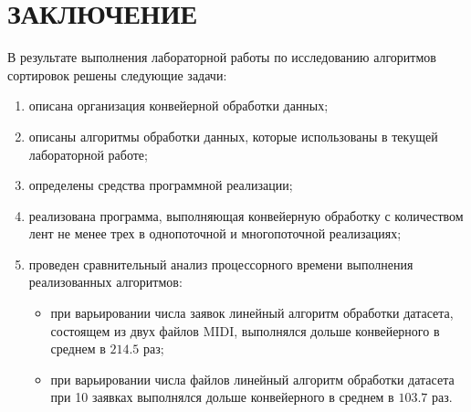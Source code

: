 \chapter*{ЗАКЛЮЧЕНИЕ}

В результате выполнения лабораторной работы по исследованию алгоритмов сортировок решены следующие задачи:
\begin{enumerate}
    \item описана организация конвейерной обработки данных;
	\item описаны алгоритмы обработки данных, которые использованы в текущей лабораторной работе;
	\item определены средства программной реализации;
    \item реализована программа, выполняющая конвейерную обработку с количеством лент не менее трех в однопоточной и многопоточной реализациях;
	\item проведен сравнительный анализ процессорного времени выполнения реализованных алгоритмов:
	\begin{itemize}
	\item при варьировании числа заявок линейный алгоритм обработки датасета, состоящем из двух файлов MIDI, выполнялся дольше конвейерного в среднем в $214.5$ раз;
	\item при варьировании числа файлов линейный алгоритм обработки датасета при 10 заявках выполнялся дольше конвейерного в среднем в $103.7$ раз.
	\end{itemize}
\end{enumerate}
